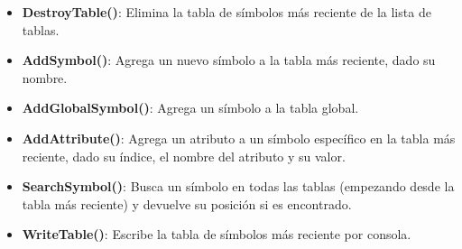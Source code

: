 \begin{itemize}
\begin{itemize}
\begin{itemize}
            \item \textbf{DestroyTable()}: Elimina la tabla de símbolos más reciente de la lista de tablas.
          
            \item \textbf{AddSymbol()}: Agrega un nuevo símbolo a la tabla más reciente, dado su nombre.
          
            \item \textbf{AddGlobalSymbol()}: Agrega un símbolo a la tabla global.
          
            \item \textbf{AddAttribute()}: Agrega un atributo a un símbolo específico en la tabla más reciente, dado su índice, el nombre del atributo y su valor.
          
            \item \textbf{SearchSymbol()}: Busca un símbolo en todas las tablas (empezando desde la tabla más reciente) y devuelve su posición si es encontrado.
          
            \item \textbf{WriteTable()}: Escribe la tabla de símbolos más reciente por consola.
        \end{itemize}
    \end{itemize}
\end{itemize}
